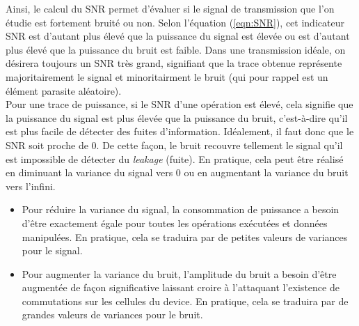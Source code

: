 \documentclass[10pt, oneside, a4paper]{article}
\begin{document}
\vspace{-0.2 cm}Ainsi, le calcul du SNR permet d'évaluer si le signal de transmission que l'on étudie est fortement bruité ou non. Selon l'équation (\ref{eqn:SNR}), cet indicateur SNR est d'autant plus élevé que la puissance du signal est élevée ou est d'autant plus élevé que la puissance du bruit est faible. Dans une transmission idéale, on désirera toujours un SNR très grand, signifiant que la trace obtenue représente majoritairement le signal et minoritairment le bruit (qui pour rappel est un élément parasite aléatoire). \\
Pour une trace de puissance, si le SNR d'une opération est élevé, cela signifie que la puissance du signal est plus élevée que la puissance du bruit, c'est-à-dire qu'il est plus facile de détecter des fuites d'information. Idéalement, il faut donc que le SNR soit proche de 0. De cette façon, le bruit recouvre tellement le signal qu'il est impossible de détecter du \textit{leakage} (fuite). En pratique, cela peut être réalisé en diminuant la variance du signal vers 0 ou en augmentant la variance du bruit vers l'infini.
\begin{itemize}
\item Pour réduire la variance du signal, la consommation de puissance a besoin d'être exactement égale pour toutes les opérations exécutées et données manipulées. En pratique, cela se traduira par de petites valeurs de variances pour le signal.
\item Pour augmenter la variance du bruit, l'amplitude du bruit a besoin d'être augmentée de façon significative laissant croire à l'attaquant l'existence de commutations sur les cellules du device. En pratique, cela se traduira par de grandes valeurs de variances pour le bruit.
\end{itemize}

\newpage
\end{document}
